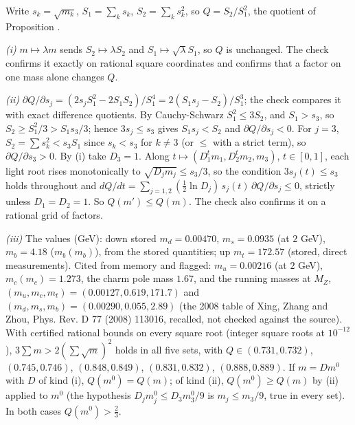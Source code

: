 Write $s_{k} = \sqrt{m_{k}}$, $S_{1} = \sum_{k}s_{k}$, $S_{2} = \sum_{k}s_{k}^{2}$, so $Q = S_{2}/S_{1}^{2}$, the quotient of Proposition .

\emph{(i)} $m \mapsto \lambda m$ sends $S_{2} \mapsto \lambda S_{2}$ and $S_{1} \mapsto \sqrt{\lambda}S_{1}$, so $Q$ is unchanged. The check confirms it exactly on rational square coordinates and confirms that a factor on one mass alone changes $Q$.

\emph{(ii)} $\partial Q/\partial s_{j} = (2s_{j}S_{1}^{2} - 2S_{1}S_{2})/S_{1}^{4} = 2(S_{1}s_{j} - S_{2})/S_{1}^{3}$; the check compares it with exact difference quotients. By Cauchy-Schwarz $S_{1}^{2} \le 3S_{2}$, and $S_{1} > s_{3}$, so $S_{2} \ge S_{1}^{2}/3 > S_{1}s_{3}/3$; hence $3s_{j} \le s_{3}$ gives $S_{1}s_{j} < S_{2}$ and $\partial Q/\partial s_{j} < 0$. For $j = 3$, $S_{2} = \sum s_{k}^{2} < s_{3}S_{1}$ since $s_{k} < s_{3}$ for $k \ne 3$ (or $\le$ with a strict term), so $\partial Q/\partial s_{3} > 0$. By (i) take $D_{3} = 1$. Along $t \mapsto (D_{1}^{t}m_{1}, D_{2}^{t}m_{2}, m_{3})$, $t \in [0,1]$, each light root rises monotonically to $\sqrt{D_{j}m_{j}} \le s_{3}/3$, so the condition $3s_{j}(t) \le s_{3}$ holds throughout and $dQ/dt = \sum_{j=1,2}(\tfrac12\ln D_{j})\,s_{j}(t)\,\partial Q/\partial s_{j} \le 0$, strictly unless $D_{1} = D_{2} = 1$. So $Q(m') \le Q(m)$. The check also confirms it on a rational grid of factors.

\emph{(iii)} The values (GeV): down stored $m_{d} = 0.00470$, $m_{s} = 0.0935$ (at $2$ GeV), $m_{b} = 4.18$ ($m_{b}(m_{b})$), from the stored quantities; up $m_{t} = 172.57$ (stored, direct measurements). Cited from memory and flagged: $m_{u} = 0.00216$ (at $2$ GeV), $m_{c}(m_{c}) = 1.273$, the charm pole mass $1.67$, and the running masses at $M_{Z}$, $(m_{u}, m_{c}, m_{t}) = (0.00127, 0.619, 171.7)$ and $(m_{d}, m_{s}, m_{b}) = (0.00290, 0.055, 2.89)$ (the 2008 table of Xing, Zhang and Zhou, Phys. Rev. D 77 (2008) 113016, recalled, not checked against the source). With certified rational bounds on every square root (integer square roots at $10^{-12}$), $3\sum m > 2(\sum\sqrt{m})^{2}$ holds in all five sets, with $Q \in (0.731, 0.732)$, $(0.745, 0.746)$, $(0.848, 0.849)$, $(0.831, 0.832)$, $(0.888, 0.889)$. If $m = D m^{0}$ with $D$ of kind (i), $Q(m^{0}) = Q(m)$; of kind (ii), $Q(m^{0}) \ge Q(m)$ by (ii) applied to $m^{0}$ (the hypothesis $D_{j}m^{0}_{j} \le D_{3}m^{0}_{3}/9$ is $m_{j} \le m_{3}/9$, true in every set). In both cases $Q(m^{0}) > \tfrac23$.

